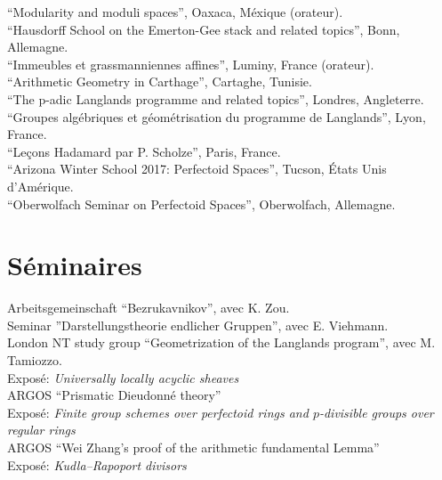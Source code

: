 \documentclass[12pt]{article} %
\begin{document}
``Modularity and moduli spaces'', Oaxaca, Méxique (orateur). \\
 
 ``Hausdorff School on the Emerton-Gee stack and related topics'', Bonn, Allemagne. \\
 
``Immeubles et grassmanniennes affines'',  Luminy, France (orateur). \\

``Arithmetic Geometry in Carthage'', Cartaghe, Tunisie. \\

``The p-adic Langlands programme and related topics'', Londres, Angleterre.\\

``Groupes algébriques et géométrisation du programme de Langlands'', Lyon, France. \\

``Leçons Hadamard par P. Scholze'', Paris, France. \\

``Arizona Winter School 2017: Perfectoid Spaces'', Tucson, États Unis d'Amérique.\\

``Oberwolfach Seminar on Perfectoid Spaces'', Oberwolfach, Allemagne.


\section*{Séminaires}
Arbeitsgemeinschaft ``Bezrukavnikov'', avec K. Zou.\\

Seminar ''Darstellungstheorie  endlicher Gruppen'', avec E. Viehmann. \\

  London NT study group ``Geometrization of the Langlands program'', avec M. Tamiozzo. \\

\iffalse
Exposé: {\it Universally locally acyclic sheaves} \\

 ARGOS ``Prismatic Dieudonné theory''\\
Exposé: {\it Finite group schemes over perfectoid rings and $p$-divisible groups over regular rings}\\

 ARGOS ``Wei Zhang's proof of the arithmetic fundamental Lemma''\\
Exposé: {\it Kudla--Rapoport divisors} \\
\end{document}

